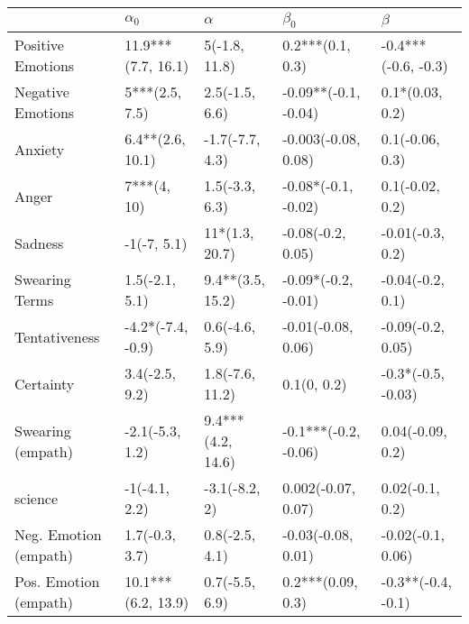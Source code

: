 \begin{tabular}{lllll}
\toprule
{} &          $\alpha_0$ &           $\alpha$ &             $\beta_0$ &              $\beta$ \\
\midrule
Positive Emotions     &  11.9***(7.7, 16.1) &      5(-1.8, 11.8) &      0.2***(0.1, 0.3) &  -0.4***(-0.6, -0.3) \\
Negative Emotions     &      5***(2.5, 7.5) &     2.5(-1.5, 6.6) &  -0.09**(-0.1, -0.04) &      0.1*(0.03, 0.2) \\
Anxiety               &    6.4**(2.6, 10.1) &    -1.7(-7.7, 4.3) &   -0.003(-0.08, 0.08) &      0.1(-0.06, 0.3) \\
Anger                 &         7***(4, 10) &     1.5(-3.3, 6.3) &   -0.08*(-0.1, -0.02) &      0.1(-0.02, 0.2) \\
Sadness               &         -1(-7, 5.1) &     11*(1.3, 20.7) &     -0.08(-0.2, 0.05) &     -0.01(-0.3, 0.2) \\
Swearing Terms        &      1.5(-2.1, 5.1) &   9.4**(3.5, 15.2) &   -0.09*(-0.2, -0.01) &     -0.04(-0.2, 0.1) \\
Tentativeness         &   -4.2*(-7.4, -0.9) &     0.6(-4.6, 5.9) &    -0.01(-0.08, 0.06) &    -0.09(-0.2, 0.05) \\
Certainty             &      3.4(-2.5, 9.2) &    1.8(-7.6, 11.2) &           0.1(0, 0.2) &   -0.3*(-0.5, -0.03) \\
Swearing (empath)     &     -2.1(-5.3, 1.2) &  9.4***(4.2, 14.6) &  -0.1***(-0.2, -0.06) &     0.04(-0.09, 0.2) \\
science               &       -1(-4.1, 2.2) &      -3.1(-8.2, 2) &    0.002(-0.07, 0.07) &      0.02(-0.1, 0.2) \\
Neg. Emotion (empath) &      1.7(-0.3, 3.7) &     0.8(-2.5, 4.1) &    -0.03(-0.08, 0.01) &    -0.02(-0.1, 0.06) \\
Pos. Emotion (empath) &  10.1***(6.2, 13.9) &     0.7(-5.5, 6.9) &     0.2***(0.09, 0.3) &   -0.3**(-0.4, -0.1) \\
\bottomrule
\end{tabular}
